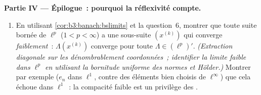 \begin{problem}[{Problème de fin de semaine --- $(\ell^p)' =
\ell^q$, réflexivité, et l'étrangeté de $\ell^\infty$}]
\medskip
\noindent\textbf{Partie IV --- Épilogue~: pourquoi la
réflexivité compte.}
\begin{enumerate}[resume]
  \item En utilisant \cref{cor:b3:banach:bslimits} et la
        question~6, montrer que toute suite bornée de
        $\ell^p$ ($1 < p < \infty$) a une sous-suite
        $(x^{(k)})$ qui converge \emph{faiblement}~:
        $\Lambda(x^{(k)})$ converge pour toute $\Lambda \in
        (\ell^p)'$. \emph{(Extraction diagonale sur les
        dénombrablement coordonnées~; identifier la limite
        faible dans $\ell^p$ en utilisant la bornitude
        uniforme des normes et Hölder.)} Montrer par exemple
        ($e_n$ dans $\ell^1$, contre des éléments bien choisis
        de $\ell^\infty$) que cela échoue dans $\ell^1$~: la
        compacité faible est un privilège des .
\end{enumerate}


\end{problem}
